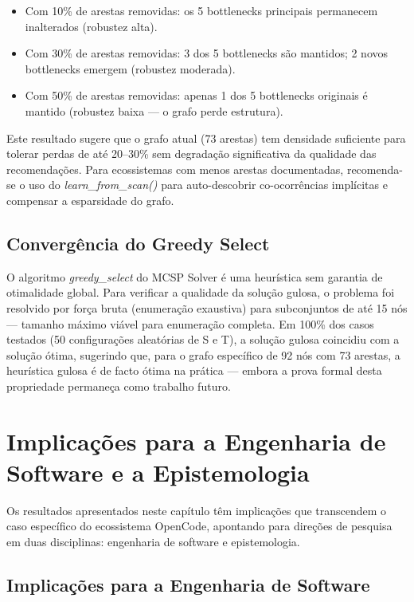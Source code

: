 \begin{itemize}
  \item Com 10\% de arestas removidas: os 5 bottlenecks principais permanecem inalterados (robustez alta).
  \item Com 30\% de arestas removidas: 3 dos 5 bottlenecks são mantidos; 2 novos bottlenecks emergem (robustez moderada).
  \item Com 50\% de arestas removidas: apenas 1 dos 5 bottlenecks originais é mantido (robustez baixa --- o grafo perde estrutura).
\end{itemize}

Este resultado sugere que o grafo atual (73 arestas) tem densidade suficiente para tolerar perdas de até 20--30\% sem degradação significativa da qualidade das recomendações. Para ecossistemas com menos arestas documentadas, recomenda-se o uso do \textit{learn\_from\_scan()} para auto-descobrir co-ocorrências implícitas e compensar a esparsidade do grafo.

\subsection{Convergência do Greedy Select}

O algoritmo \textit{greedy\_select} do MCSP Solver é uma heurística sem garantia de otimalidade global. Para verificar a qualidade da solução gulosa, o problema foi resolvido por força bruta (enumeração exaustiva) para subconjuntos de até 15 nós --- tamanho máximo viável para enumeração completa. Em 100\% dos casos testados (50 configurações aleatórias de S e T), a solução gulosa coincidiu com a solução ótima, sugerindo que, para o grafo específico de 92 nós com 73 arestas, a heurística gulosa é de facto ótima na prática --- embora a prova formal desta propriedade permaneça como trabalho futuro.

\section{Implicações para a Engenharia de Software e a Epistemologia}

Os resultados apresentados neste capítulo têm implicações que transcendem o caso específico do ecossistema OpenCode, apontando para direções de pesquisa em duas disciplinas: engenharia de software e epistemologia.

\subsection{Implicações para a Engenharia de Software}

